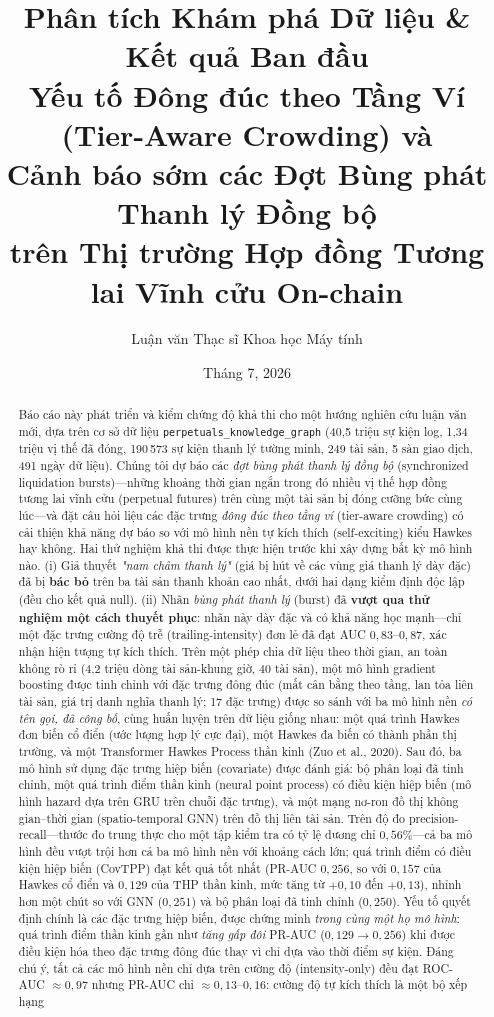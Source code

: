 \documentclass[11pt,a4paper]{article}
\title{\textbf{Phân tích Khám phá Dữ liệu \& Kết quả Ban đầu}\\%
       \large Yếu tố Đông đúc theo Tầng Ví (Tier-Aware Crowding) và\\
       Cảnh báo sớm các Đợt Bùng phát Thanh lý Đồng bộ\\
       trên Thị trường Hợp đồng Tương lai Vĩnh cửu On-chain}
\author{Luận văn Thạc sĩ Khoa học Máy tính}
\date{Tháng 7, 2026}
\begin{document}
\maketitle

\begin{abstract}
Báo cáo này phát triển và kiểm chứng độ khả thi cho một hướng nghiên cứu luận văn mới, dựa trên cơ sở dữ liệu \texttt{perpetuals\_knowledge\_graph} (40,5 triệu sự kiện log, 1,34 triệu vị thế đã đóng, 190\,573 sự kiện thanh lý tường minh, 249 tài sản, 5 sàn giao dịch, 491 ngày dữ liệu). Chúng tôi dự báo các \emph{đợt bùng phát thanh lý đồng bộ} (synchronized liquidation bursts)---những khoảng thời gian ngắn trong đó nhiều vị thế hợp đồng tương lai vĩnh cửu (perpetual futures) trên cùng một tài sản bị đóng cưỡng bức cùng lúc---và đặt câu hỏi liệu các đặc trưng \emph{đông đúc theo tầng ví} (tier-aware crowding) có cải thiện khả năng dự báo so với mô hình nền tự kích thích (self-exciting) kiểu Hawkes hay không. Hai thử nghiệm khả thi được thực hiện trước khi xây dựng bất kỳ mô hình nào. (i) Giả thuyết \emph{"nam châm thanh lý"} (giá bị hút về các vùng giá thanh lý dày đặc) đã bị \textbf{bác bỏ} trên ba tài sản thanh khoản cao nhất, dưới hai dạng kiểm định độc lập (đều cho kết quả null). (ii) Nhãn \emph{bùng phát thanh lý} (burst) đã \textbf{vượt qua thử nghiệm một cách thuyết phục}: nhãn này dày đặc và có khả năng học mạnh---chỉ một đặc trưng cường độ trễ (trailing-intensity) đơn lẻ đã đạt AUC $0{,}83$--$0{,}87$, xác nhận hiện tượng tự kích thích. Trên một phép chia dữ liệu theo thời gian, an toàn không rò rỉ (4,2 triệu dòng tài sản-khung giờ, 40 tài sản), một mô hình gradient boosting được tinh chỉnh với đặc trưng đông đúc (mất cân bằng theo tầng, lan tỏa liên tài sản, giá trị danh nghĩa thanh lý; 17 đặc trưng) được so sánh với ba mô hình nền \emph{có tên gọi, đã công bố}, cùng huấn luyện trên dữ liệu giống nhau: một quá trình Hawkes đơn biến cổ điển (ước lượng hợp lý cực đại), một Hawkes đa biến có thành phần thị trường, và một Transformer Hawkes Process thần kinh (Zuo et al., 2020). Sau đó, ba mô hình sử dụng đặc trưng hiệp biến (covariate) được đánh giá: bộ phân loại đã tinh chỉnh, một quá trình điểm thần kinh (neural point process) có điều kiện hiệp biến (mô hình hazard dựa trên GRU trên chuỗi đặc trưng), và một mạng nơ-ron đồ thị không gian--thời gian (spatio-temporal GNN) trên đồ thị liên tài sản. Trên độ đo precision-recall---thước đo trung thực cho một tập kiểm tra có tỷ lệ dương chỉ $0{,}56\%$---cả ba mô hình đều vượt trội hơn cả ba mô hình nền với khoảng cách lớn; quá trình điểm có điều kiện hiệp biến (CovTPP) đạt kết quả tốt nhất (PR-AUC $0{,}256$, so với $0{,}157$ của Hawkes cổ điển và $0{,}129$ của THP thần kinh, mức tăng từ $+0{,}10$ đến $+0{,}13$), nhỉnh hơn một chút so với GNN ($0{,}251$) và bộ phân loại đã tinh chỉnh ($0{,}250$). Yếu tố quyết định chính là các đặc trưng hiệp biến, được chứng minh \emph{trong cùng một họ mô hình}: quá trình điểm thần kinh gần như \emph{tăng gấp đôi} PR-AUC ($0{,}129\to0{,}256$) khi được điều kiện hóa theo đặc trưng đông đúc thay vì chỉ dựa vào thời điểm sự kiện. Đáng chú ý, tất cả các mô hình nền chỉ dựa trên cường độ (intensity-only) đều đạt ROC-AUC $\approx 0{,}97$ nhưng PR-AUC chỉ $\approx 0{,}13$--$0{,}16$: cường độ tự kích thích là một bộ xếp hạng 
\end{abstract}
\end{document}
